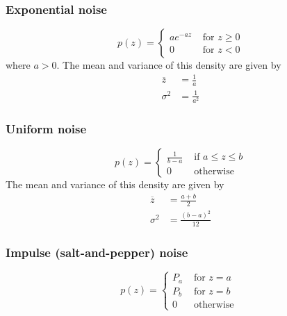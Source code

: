 	\subsubsection{Exponential noise}
		\begin{equation}
			p(z) = 
				\begin{cases}
					ae^{-az} & \text{ for } z \geq 0 \\
					0 & \text{ for } z < 0
				\end{cases}
		\end{equation}
		where $a>0$. The mean and variance of this density are given by
		\begin{align}
			\overline{z} &= \frac{1}{a} \\
			\sigma^2 &= \frac{1}{a^2}
		\end{align}
	
	\subsubsection{Uniform noise}
		\begin{equation}
			p(z) = 
				\begin{cases}
					\frac{1}{b-a} & \text{ if } a \leq z \leq b \\
					0 & \text{ otherwise } 
				\end{cases}
		\end{equation}		
		The mean and variance of this density are given by
		\begin{align}
			\overline{z} &= \frac{a+b}{2} \\
			\sigma^2 &= \frac{\left(b-a\right)^2}{12}
		\end{align}
	
	\subsubsection{Impulse (salt-and-pepper) noise}
		\begin{equation}
			p(z) = 
				\begin{cases}
					P_a & \text{ for } z = a \\
					P_b & \text{ for } z = b \\
					0 & \text{ otherwise }
				\end{cases}
		\end{equation}	
	

